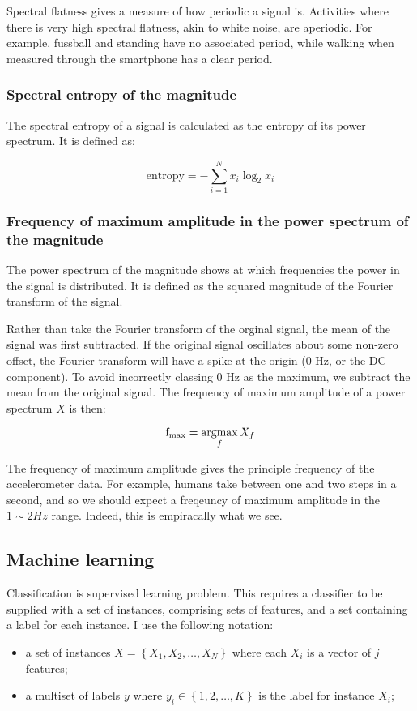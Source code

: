         Spectral flatness gives a measure of how periodic a signal is. Activities where there is very high spectral flatness, akin to white noise, are aperiodic. For example, fussball and standing have no associated period, while walking when measured through the smartphone has a clear period.
      \subsubsection{Spectral entropy of the magnitude}
        The spectral entropy of a signal is calculated as the entropy of its power spectrum. It is defined as:

        $$\mathrm{entropy} = -\sum\limits_{i=1}^N x_i \log_2 x_i$$
      \subsubsection{Frequency of maximum amplitude in the power spectrum of the magnitude}
        The power spectrum of the magnitude shows at which frequencies the power in the signal is distributed. It is defined as the squared magnitude of the Fourier transform of the signal.
        
        Rather than take the Fourier transform of the orginal signal, the mean of the signal was first subtracted. If the original signal oscillates about some non-zero offset, the Fourier transform will have a spike at the origin (0 \si{Hz}, or the DC component). To avoid incorrectly classing 0 \si{Hz} as the maximum, we subtract the mean from the original signal. The frequency of maximum amplitude of a power spectrum $X$ is then:
        
        $$\mathrm{f}_\mathrm{max} = \operatorname*{argmax}_f X_f$$
        
        The frequency of maximum amplitude gives the principle frequency of the accelerometer data. For example, humans take between one and two steps in a second, and so we should expect a freqeuncy of maximum amplitude in the $1 \sim 2 \si{Hz}$ range. Indeed, this is empiracally what we see.
        
    \subsection{Machine learning}
      Classification is supervised learning problem. This requires a classifier to be supplied with a set of instances, comprising sets of features, and a set containing a label for each instance. I use the following notation:
      \begin{itemize}
        \item a set of instances $X = \left\{X_1, X_2, \dots, X_N\right\}$ where each $X_i$ is a vector of $j$ features;
        \item a multiset of labels $y$ where $y_i \in \left\{1, 2, \dots, K\right\}$ is the label for instance $X_i$;
      \end{itemize}  
      
